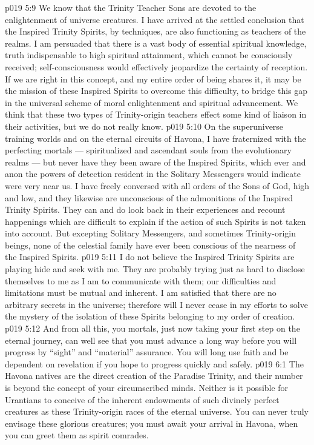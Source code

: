\vs p019 5:9 We know that the Trinity Teacher Sons are devoted to the  enlightenment of universe creatures. I have arrived at the settled conclusion that the Inspired Trinity Spirits, by  techniques, are also functioning as teachers of the realms. I am persuaded that there is a vast body of essential spiritual knowledge, truth indispensable to high spiritual attainment, which cannot be consciously received; self\hyp{}consciousness would effectively jeopardize the certainty of reception. If we are right in this concept, and my entire order of being shares it, it may be the mission of these Inspired Spirits to overcome this difficulty, to bridge this gap in the universal scheme of moral enlightenment and spiritual advancement. We think that these two types of Trinity\hyp{}origin teachers effect some kind of liaison in their activities, but we do not really know.
\vs p019 5:10 On the superuniverse training worlds and on the eternal circuits of Havona, I have fraternized with the perfecting mortals --- spiritualized and ascendant souls from the evolutionary realms --- but never have they been aware of the Inspired Spirits, which ever and anon the powers of detection resident in the Solitary Messengers would indicate were very near us. I have freely conversed with all orders of the Sons of God, high and low, and they likewise are unconscious of the admonitions of the Inspired Trinity Spirits. They can and do look back in their experiences and recount happenings which are difficult to explain if the action of such Spirits is not taken into account. But excepting Solitary Messengers, and sometimes Trinity\hyp{}origin beings, none of the celestial family have ever been conscious of the nearness of the Inspired Spirits.
\vs p019 5:11 I do not believe the Inspired Trinity Spirits are playing hide and seek with me. They are probably trying just as hard to disclose themselves to me as I am to communicate with them; our difficulties and limitations must be mutual and inherent. I am satisfied that there are no arbitrary secrets in the universe; therefore will I never cease in my efforts to solve the mystery of the isolation of these Spirits belonging to my order of creation.
\vs p019 5:12 And from all this, you mortals, just now taking your first step on the eternal journey, can well see that you must advance a long way before you will progress by “sight” and “material” assurance. You will long use faith and be dependent on revelation if you hope to progress quickly and safely.
\vs p019 6:1 The Havona natives are the direct creation of the Paradise Trinity, and their number is beyond the concept of your circumscribed minds. Neither is it possible for Urantians to conceive of the inherent endowments of such divinely perfect creatures as these Trinity\hyp{}origin races of the eternal universe. You can never truly envisage these glorious creatures; you must await your arrival in Havona, when you can greet them as spirit comrades.
